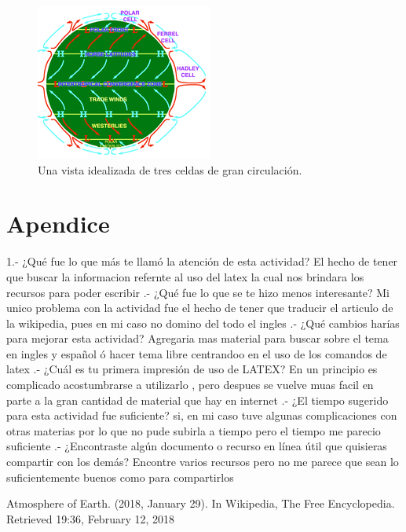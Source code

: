 \documentclass{article}
\begin{document}
\begin{figure}
  \centering
  \includegraphics[scale=0.6]{circulacion.png}
  \caption{Una vista idealizada de tres celdas de gran circulación.}
  \label{fig:circulacion de la atmosfera}
\end{figure}

\section{Apendice}
1.- ¿Qué fue lo que más te llamó la atención de esta actividad?
\newline
El hecho de tener que buscar la informacion refernte al uso del latex la cual nos brindara los recursos para poder escribir
.- ¿Qué fue lo que se te hizo menos interesante?
\newline
Mi unico problema con la actividad fue el hecho de tener que traducir el articulo de la wikipedia, pues en mi caso no domino del todo el ingles
.- ¿Qué cambios harías para mejorar esta actividad?
\newline
Agregaria mas material para buscar sobre el tema en ingles y español ó hacer tema libre centrandoo en el uso de los comandos de latex
.- ¿Cuál es tu primera impresión de uso de LATEX?
\newline
En un principio es complicado acostumbrarse a utilizarlo , pero despues se vuelve muas facil en parte a la gran cantidad de material que hay en internet
.- ¿El tiempo sugerido para esta actividad fue suficiente?
si, en mi caso tuve algunas complicaciones con otras materias por lo que no pude subirla a tiempo pero el tiempo me parecio suficiente
.- ¿Encontraste algún documento o recurso en línea útil que quisieras compartir con los demás?
\newline
Encontre varios recursos pero no me parece que sean lo suficientemente buenos como para compartirlos



\begin{thebibliography}{0}
 Atmosphere of Earth. (2018, January 29). In Wikipedia, The Free Encyclopedia. Retrieved 19:36, February 12, 2018
\end{thebibliography}
\end{document}
